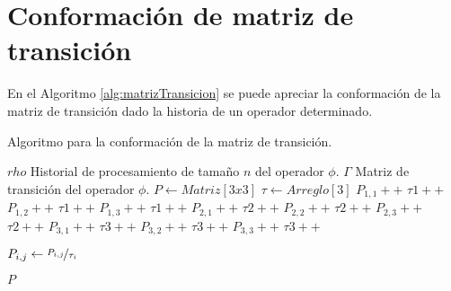 \chapter{Conformación de matriz de transición}
\label{apendice:matrizTransicion}

En el Algoritmo \ref{alg:matrizTransicion} se puede apreciar la conformación de la matriz de transición dado la historia de un operador determinado.

\begin{algorithm}[!hb]
	\caption{Algoritmo para la conformación de la matriz de transición.}
	\label{alg:matrizTransicion}
	\begin{algorithmic}[1]
	\REQUIRE $rho$ Historial de procesamiento de tamaño $n$ del operador $\phi$.
	\ENSURE $\Gamma$ Matriz de transición del operador $\phi$.
	\STATE $P \leftarrow Matriz[3x3]$ 
	\STATE $\tau \leftarrow Arreglo[3]$ 
			\STATE $P_{1,1}++$
			\STATE $\tau{1}++$
			\STATE $P_{1,2}++$
			\STATE $\tau{1}++$
			\STATE $P_{1,3}++$
			\STATE $\tau{1}++$
			\STATE $P_{2,1}++$
			\STATE $\tau{2}++$
			\STATE $P_{2,2}++$
			\STATE $\tau{2}++$
			\STATE $P_{2,3}++$
			\STATE $\tau{2}++$
			\STATE $P_{3,1}++$
			\STATE $\tau{3}++$
			\STATE $P_{3,2}++$
			\STATE $\tau{3}++$
		\ELSE
			\STATE $P_{3,3}++$
			\STATE $\tau{3}++$
		\ENDIF	
	\ENDFOR

				\STATE $P_{i,j} \leftarrow \nicefrac{P_{i,j}}{\tau_{i}}$
			\ENDFOR
		\ENDIF
	\ENDFOR
	
	\RETURN $P$ 
	\end{algorithmic}
\end{algorithm}